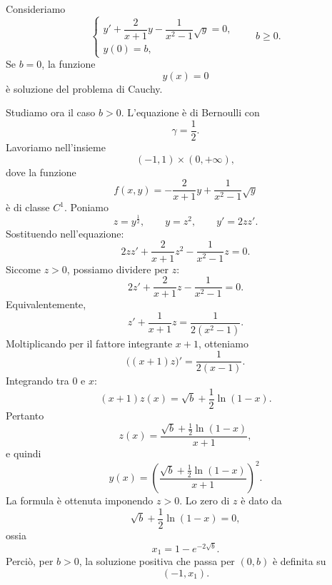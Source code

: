 \documentclass[a4paper]{article}
\begin{document}
\begin{radioactive}
\begin{snippetexample}{}
    Consideriamo
    \[
        \begin{cases}
            y'+\dfrac{2}{x+1}y-\dfrac{1}{x^2-1}\sqrt{y}=0,\\
            y(0)=b,
        \end{cases}
        \qquad b\geq 0.
    \]
    Se \(b=0\), la funzione
    \[
        y(x)=0
    \]
    è soluzione del problema di Cauchy.

    Studiamo ora il caso \(b>0\). L'equazione è di Bernoulli con
    \[
        \gamma=\frac{1}{2}.
    \]
    Lavoriamo nell'insieme
    \[
        (-1,1)\times(0,+\infty),
    \]
    dove la funzione
    \[
        f(x,y)=-\frac{2}{x+1}y+\frac{1}{x^2-1}\sqrt{y}
    \]
    è di classe \(C^1\). Poniamo
    \[
        z=y^{\frac{1}{2}},
        \qquad
        y=z^2,
        \qquad
        y'=2zz'.
    \]
    Sostituendo nell'equazione:
    \[
        2zz'+\frac{2}{x+1}z^2-\frac{1}{x^2-1}z=0.
    \]
    Siccome \(z>0\), possiamo dividere per \(z\):
    \[
        2z'+\frac{2}{x+1}z-\frac{1}{x^2-1}=0.
    \]
    Equivalentemente,
    \[
        z'+\frac{1}{x+1}z=\frac{1}{2(x^2-1)}.
    \]
    Moltiplicando per il fattore integrante \(x+1\), otteniamo
    \[
        \bigl((x+1)z\bigr)'=\frac{1}{2(x-1)}.
    \]
    Integrando tra \(0\) e \(x\):
    \[
        (x+1)z(x)=\sqrt{b}+\frac{1}{2}\ln(1-x).
    \]
    Pertanto
    \[
        z(x)=\frac{\sqrt{b}+\frac{1}{2}\ln(1-x)}{x+1},
    \]
    e quindi
    \[
        y(x)=
        \left(
            \frac{\sqrt{b}+\frac{1}{2}\ln(1-x)}{x+1}
        \right)^2.
    \]
    La formula è ottenuta imponendo \(z>0\). Lo zero di \(z\) è dato da
    \[
        \sqrt{b}+\frac{1}{2}\ln(1-x)=0,
    \]
    ossia
    \[
        x_1=1-e^{-2\sqrt{b}}.
    \]
    Perciò, per \(b>0\), la soluzione positiva che passa per \((0,b)\) è definita su
    \[
        (-1,x_1).
    \]

    \begin{center}
    \end{center}


\end{snippetexample}
\end{radioactive}
\end{document}
